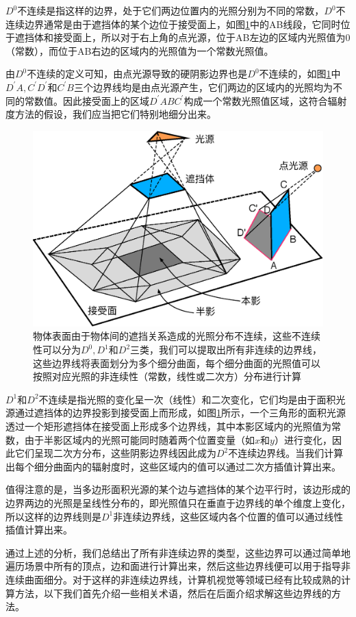 $D^{0}$不连续是指这样的边界，处于它们两边位置内的光照分别为不同的常数，$D^{0}$不连续边界通常是由于遮挡体的某个边位于接受面上，如图\ref{f:r-boundaries}中的AB线段，它同时位于遮挡体和接受面上，所以对于右上角的点光源，位于AB左边的区域内光照值为0（常数），而位于AB右边的区域内的光照值为一个常数光照值。

由$D^{0}$不连续的定义可知，由点光源导致的硬阴影边界也是$D^{0}$不连续的，如图\ref{f:r-boundaries}中$D^{'}A,C^{'}D^{'}$和$C^{'}B$三个边界线均是由点光源产生，它们两边的区域内的光照均为不同的常数值。因此接受面上的区域$D^{'}ABC^{'}$构成一个常数光照值区域，这符合辐射度方法的假设，我们应当把它们特别地细分出来。

\begin{figure}
\sidecaption
	\includegraphics[width=.65\textwidth]{figures/r/boundaries}
	\caption{物体表面由于物体间的遮挡关系造成的光照分布不连续，这些不连续性可以分为$D^{0},D^{1}$和$D^{2}$三类，我们可以提取出所有非连续的边界线，这些边界线将表面划分为多个细分曲面，每个细分曲面的光照值可以按照对应光照的非连续性（常数，线性或二次方）分布进行计算}
	\label{f:r-boundaries}
\end{figure}

$D^{1}$和$D^{2}$不连续是指光照的变化呈一次（线性）和二次变化，它们均是由于面积光源通过遮挡体的边界投影到接受面上而形成，如图\ref{f:r-boundaries}所示，一个三角形的面积光源透过一个矩形遮挡体在接受面上形成多个边界线，其中本影区域内的光照值为常数，由于半影区域内的光照可能同时随着两个位置变量（如$x$和$y$）进行变化，因此它们呈现二次方分布，这些阴影边界线因此成为$D^{2}$不连续边界线。当我们计算出每个细分曲面内的辐射度时，这些区域内的值可以通过二次方插值计算出来。

值得注意的是，当多边形面积光源的某个边与遮挡体的某个边平行时，该边形成的边界两边的光照是呈线性分布的，即光照值只在垂直于边界线的单个维度上变化，所以这样的边界线则是$D^{1}$非连续边界线，这些区域内各个位置的值可以通过线性插值计算出来。

通过上述的分析，我们总结出了所有非连续边界的类型，这些边界可以通过简单地遍历场景中所有的顶点，边和面进行计算出来，然后这些边界线便可以用于指导非连续曲面细分。对于这样的非连续边界线，计算机视觉等领域已经有比较成熟的计算方法，以下我们首先介绍一些相关术语，然后在后面介绍求解这些边界线的方法。




